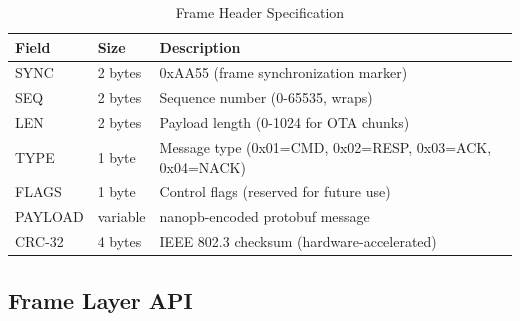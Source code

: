 \begin{table}[h]
\centering
\caption{Frame Header Specification}
\begin{tabular}{llp{6cm}}
\toprule
\textbf{Field} & \textbf{Size} & \textbf{Description} \\
\midrule
SYNC & 2 bytes & 0xAA55 (frame synchronization marker) \\
SEQ & 2 bytes & Sequence number (0-65535, wraps) \\
LEN & 2 bytes & Payload length (0-1024 for OTA chunks) \\
TYPE & 1 byte & Message type (0x01=CMD, 0x02=RESP, 0x03=ACK, 0x04=NACK) \\
FLAGS & 1 byte & Control flags (reserved for future use) \\
PAYLOAD & variable & nanopb-encoded protobuf message \\
CRC-32 & 4 bytes & IEEE 802.3 checksum (hardware-accelerated) \\
\bottomrule
\end{tabular}
\end{table}

\subsection{Frame Layer API}

